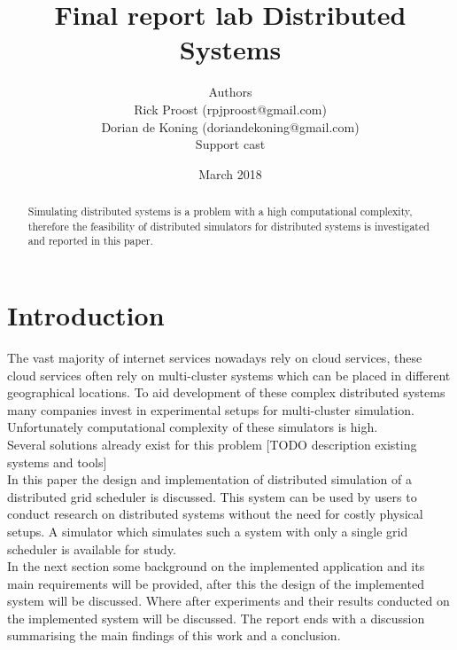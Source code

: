 \documentclass[a4paper]{article}
\title{Final report lab Distributed Systems}
\author{Authors \\ Rick Proost  (rpjproost@gmail.com)\\  Dorian de Koning (doriandekoning@gmail.com)  \\ Support cast}
\date{March 2018}
\begin{document}
\maketitle

\begin{abstract}
    Simulating distributed systems is a problem with a high computational complexity, therefore the feasibility of distributed simulators for distributed systems is investigated and reported in this paper.
    \cite{adams1995hitchhiker} %
    
\end{abstract}

\section{Introduction}
The vast majority of internet services nowadays rely on cloud services, these cloud services often rely on multi-cluster systems which can be placed in different geographical locations. 
To aid development of these complex distributed systems many companies invest in experimental setups for multi-cluster simulation. 
Unfortunately computational complexity of these simulators is high.\\

Several solutions already exist for this problem [TODO description existing systems and tools]\\%

In this paper the design and implementation of distributed simulation of a distributed grid scheduler is discussed. 
This system can be used by users to conduct research on distributed systems without the need for costly physical setups. 
A simulator which simulates such a system with only a single grid scheduler is available for study.\\
In the next section some background on the implemented application and its main requirements will be provided, after this the design of the implemented system will be discussed. 
Where after experiments and their results conducted on the implemented system will be discussed. 
The report ends with a discussion summarising the main findings of this work and a conclusion.
\end{document}
